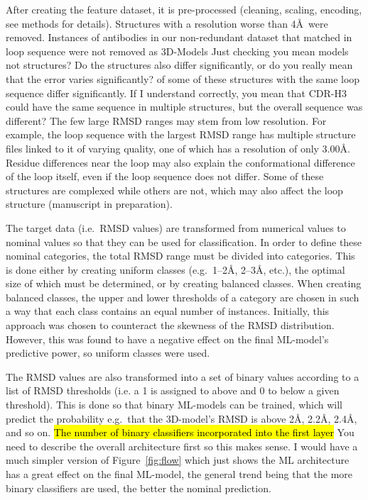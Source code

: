 \documentclass[12pt]{article}
\newcommand{\lilian}[1]{ {\color{red}{\bfseries Lilian:} #1}}
\newcommand{\highlight}[1]{\hl{#1}}
\begin{document}
After creating the feature dataset, it is pre-processed (cleaning,
scaling, encoding, see methods for details). Structures with a
resolution worse than 4\AA\ were removed.
Instances of antibodies in our non-redundant dataset that matched in loop sequence were
not removed as 3D-Models \lilian{Just checking you mean models not structures? Do the structures also differ significantly, or do you really mean that the error varies significantly?} of some of these structures with the same loop
sequence differ significantly.
\lilian{If I understand correctly, you mean that CDR-H3 could have the same sequence in multiple structures, but the overall sequence was different?}
The few large RMSD ranges may stem from
low resolution. For example, the loop sequence with the largest RMSD range 
has multiple structure files linked to it of varying quality, one of which has a resolution of only 3.00\AA. Residue differences near the loop may also
explain the conformational difference of the loop itself, 
even if the loop sequence does not differ. Some of these structures are
complexed while others are not, which may also affect the loop
structure (manuscript in preparation).


The target data (i.e.\ RMSD values) are transformed from numerical
values to nominal values so that they can be used for
classification. In order to define these nominal categories, the total
RMSD range must be divided into categories. This is done either by
creating uniform classes (e.g.\ 1--2\AA, 2--3\AA, etc.), the optimal size of which
must be determined, or by creating balanced classes. When
creating balanced classes, the upper and lower thresholds of a
category are chosen in such a way that each class contains an equal
number of instances. Initially, this approach was chosen to counteract the
skewness of the RMSD distribution. However, this was found to
have a negative effect on the final ML-model's predictive power, so
uniform classes were used.

The RMSD values are also transformed into a set of binary values according to a
list of RMSD thresholds (i.e. a 1 is assigned to above and 0 to below a given threshold). This is done so that binary ML-models can be
trained, which will predict the probability e.g.\ that the 3D-model's RMSD
is above 2\AA, 2.2\AA, 2.4\AA, and so on. \highlight{The number of binary
classifiers incorporated into the first layer} \lilian{You need to describe the overall architecture first so this makes sense. I would have a much simpler version of Figure~\ref{fig:flow} which just shows the ML architecture}  has a great effect on
the final ML-model, the general trend being that the more binary
classifiers are used, the better the nominal prediction. 
\end{document}

